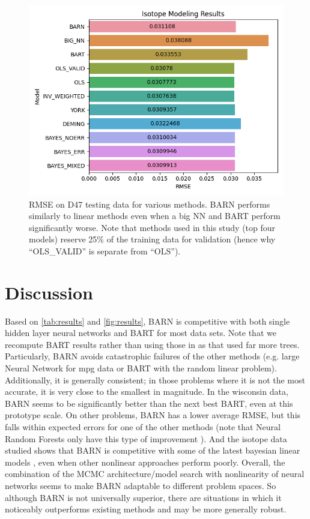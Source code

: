 \documentclass[12pt]{article}
\begin{document}
\begin{figure}[ht]
\centering
    \includegraphics[scale=.7]{figs/iso_results.png}
    \caption{RMSE on D47 testing data for various methods.  BARN performs similarly to linear methods \cite{roman2022bayclump} even when a big NN and BART perform significantly worse.  Note that methods used in this study (top four models) reserve 25\% of the training data for validation (hence why ``OLS\_VALID'' is separate from ``OLS'').}
    \label{fig:iso_results}
\end{figure}



\section{Discussion}\label{sec:dis}

Based on \autoref{tab:results} and \autoref{fig:results}, BARN is competitive with both single hidden layer neural networks and BART for most data sets.  Note that we recompute BART results rather than using those in \cite{biau2019neural} as that used far more trees.  Particularly, BARN avoids catastrophic failures of the other methods (e.g. large Neural Network for mpg data or BART with the random linear problem).  Additionally, it is generally consistent; in those problems where it is not the most accurate, it is very close to the smallest in magnitude.  In the wisconsin data, BARN seems to be significantly better than the next best BART, even at this prototype scale.  On other problems, BARN has a lower average RMSE, but this falls within expected errors for one of the other methods (note that Neural Random Forests only have this type of improvement \cite{biau2019neural}).  And the isotope data studied shows that BARN is competitive with some of the latest bayesian linear models \cite{roman2022bayclump}, even when other nonlinear approaches perform poorly.  Overall, the combination of the MCMC architecture/model search with nonlinearity of neural networks seems to make BARN adaptable to different problem spaces.  So although BARN is not universally superior, there are situations in which it noticeably outperforms existing methods and may be more generally robust.
\end{document}
